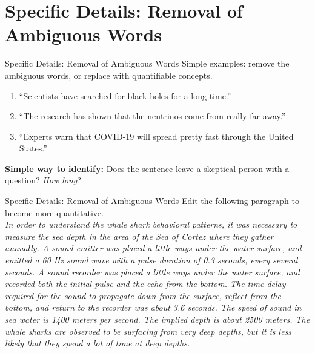 \documentclass{beamer}
\begin{document}
\section{Specific Details: Removal of Ambiguous Words}

\begin{frame}{Specific Details: Removal of Ambiguous Words}
\alert{Simple examples}: remove the ambiguous words, or replace with quantifiable concepts.
\begin{enumerate}
\item ``Scientists have searched for black holes for a long time.''
\item ``The research has shown that the neutrinos come from really far away.''
\item ``Experts warn that COVID-19 will spread pretty fast through the United States.''
\end{enumerate}
\textbf{Simple way to identify:} Does the sentence leave a skeptical person with a question?  \textit{How long}?
\end{frame}

\begin{frame}{Specific Details: Removal of Ambiguous Words}
\small
\alert{Edit the following paragraph to become more quantitative}. \\ \vspace{0.3cm}
\textit{In order to understand the whale shark behavioral patterns, it was necessary to measure the sea depth in the area of the Sea of Cortez where they gather annually.  A sound emitter was placed a little ways under the water surface, and emitted a 60 Hz sound wave with a pulse duration of 0.3 seconds, every several seconds.  A sound recorder was placed a little ways under the water surface, and recorded both the initial pulse and the echo from the bottom.  The time delay required for the sound to propagate down from the surface, reflect from the bottom, and return to the recorder was about 3.6 seconds.  The speed of sound in sea water is 1400 meters per second.  The implied depth is about 2500 meters.  The whale sharks are observed to be surfacing from very deep depths, but it is less likely that they spend a lot of time at deep depths.}
\end{frame}
\end{document}
